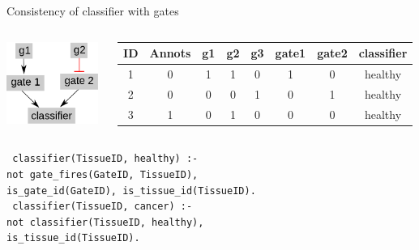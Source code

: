 \documentclass[10pt,dvipsnames]{beamer}
\begin{document}
\begin{frame}[fragile]{Consistency of classifier with gates}
 \begin{columns}  
 \begin{column}{0.25\textwidth}
 \includegraphics[width=3cm]{constraints_06.png}
 \end{column}
 \begin{column}{0.8\textwidth}
 \begin{tabular}{|c|c|c|c|c|c|c|c|}
  \hline
  ID&	Annots&	g1&	g2&	g3& gate1& gate2& classifier\\
  \hline
  1&	0&	1&	1&	0& 1& 0& healthy\\
  2&	0&	0&	0&	1& 0& 1& healthy\\
  3&	1&	0&	1&	0& 0& 0& healthy\\
  \hline
 \end{tabular}
 \end{column}
 \end{columns}
 \vspace{1.5cm}
 \texttt{
  classifier(TissueID, healthy) :-\\
    \quad not gate\_fires(GateID, TissueID),\\
    \quad is\_gate\_id(GateID), is\_tissue\_id(TissueID).\\
 }
 \vspace{0.3cm}
 \texttt{
  classifier(TissueID, cancer) :-\\
    \quad not classifier(TissueID, healthy),\\
    \quad is\_tissue\_id(TissueID).
 }
\end{frame}
\end{document}
